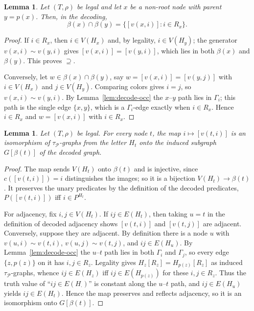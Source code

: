 \documentclass[11pt]{article}
\newtheorem{lemma}[theorem]{Lemma}
\theoremstyle{definition}
\newcommand{\Pred}{\mathcal P}
\begin{document}
\begin{lemma}\label{lem:decode-adh}
Let \((T,\rho)\) be legal and let \(x\) be a non-root node with parent
\(y=p(x)\).  Then, in the decoding,
\[
  \beta(x)\cap\beta(y)=\{[v(x,i)]:i\in R_x\}.
\]
\end{lemma}

\begin{proof}
If \(i\in R_x\), then \(i\in V(H_x)\) and, by legality, \(i\in V(H_y)\); the
generator \(v(x,i)\sim v(y,i)\) gives \([v(x,i)]=[v(y,i)]\), which lies in both
\(\beta(x)\) and \(\beta(y)\).  This proves \(\supseteq\).

Conversely, let \(w\in\beta(x)\cap\beta(y)\), say \(w=[v(x,i)]=[v(y,j)]\) with
\(i\in V(H_x)\) and \(j\in V(H_y)\).  Comparing colors gives \(i=j\), so
\(v(x,i)\sim v(y,i)\).  By Lemma~\ref{lem:decode-occ} the \(x\)--\(y\) path lies in
\(\Gamma_i\); this path is the single edge \(\{x,y\}\), which is a
\(\Gamma_i\)-edge exactly when \(i\in R_x\).  Hence \(i\in R_x\) and
\(w=[v(x,i)]\) with \(i\in R_x\).
\end{proof}

\begin{lemma}\label{lem:decode-bag}
Let \((T,\rho)\) be legal.  For every node \(t\), the map \(i\mapsto[v(t,i)]\) is
an isomorphism of \(\tau_{\Pred}\)-graphs from the letter \(H_t\) onto the induced
subgraph \(G[\beta(t)]\) of the decoded graph.
\end{lemma}

\begin{proof}
The map sends \(V(H_t)\) onto \(\beta(t)\) and is injective, since
\(c([v(t,i)])=i\) distinguishes the images; so it is a bijection
\(V(H_t)\to\beta(t)\).  It preserves the unary predicates by the definition of the
decoded predicates, \(P([v(t,i)])\) iff \(i\in P^{H_t}\).

For adjacency, fix \(i,j\in V(H_t)\).  If \(ij\in E(H_t)\), then taking \(u=t\) in
the definition of decoded adjacency shows \([v(t,i)]\) and \([v(t,j)]\) are
adjacent.  Conversely, suppose they are adjacent.  By definition there is a node
\(u\) with \(v(u,i)\sim v(t,i)\), \(v(u,j)\sim v(t,j)\), and \(ij\in E(H_u)\).  By
Lemma~\ref{lem:decode-occ} the \(u\)--\(t\) path lies in both \(\Gamma_i\) and
\(\Gamma_j\), so every edge \(\{z,p(z)\}\) on it has \(i,j\in R_z\).  Legality
gives \(H_z[R_z]=H_{p(z)}[R_z]\) as induced \(\tau_{\Pred}\)-graphs, whence
\(ij\in E(H_z)\) iff \(ij\in E(H_{p(z)})\) for these \(i,j\in R_z\).  Thus the
truth value of ``\(ij\in E(H_\cdot)\)'' is constant along the \(u\)--\(t\) path,
and \(ij\in E(H_u)\) yields \(ij\in E(H_t)\).  Hence the map preserves and reflects
adjacency, so it is an isomorphism onto \(G[\beta(t)]\).
\end{proof}
\end{document}
